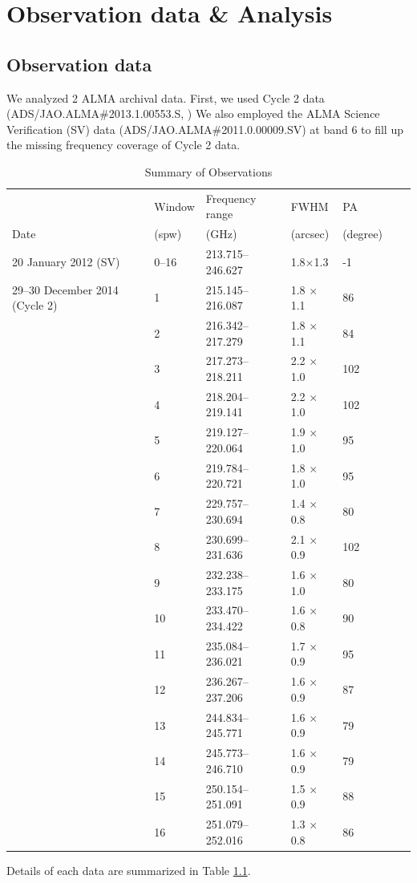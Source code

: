 \chapter{Observation data \& Analysis
\label{chap:Orion-KL}}
\section{Observation data}
We analyzed 2 ALMA archival data. First, we used Cycle 2 data (ADS/JAO.ALMA\#2013.1.00553.S, 
\cite{Pagani+2017}) 
We also employed the ALMA Science Verification (SV) data (ADS/JAO.ALMA\#2011.0.00009.SV) 
at band 6 to fill up the missing frequency coverage of Cycle 2 data. 
\renewcommand{\arraystretch}{1.5}
\begin{table}[htb]
\begin{center}
  \caption{Summary of Observations}
  \label{tab:Obs_Ori}
{\scriptsize
  \begin{tabular}{lllllll} \hline \hline
 & Window & Frequency range & FWHM & PA \\
Date & (spw)  & (GHz) & (arcsec) & (degree) \\ \hline 
20 January 2012 (SV) & 0--16 & 213.715--246.627& 1.8$\times$1.3 & -1  \\  \hline
29--30 December 2014 (Cycle 2)&1 & 215.145--216.087 & 1.8 $\times$1.1 & 86 \\
&2 & 216.342--217.279 & 1.8 $\times$1.1 & 84 \\
&3 & 217.273--218.211 & 2.2 $\times$1.0 & 102 \\
&4 & 218.204--219.141 & 2.2 $\times$1.0 & 102 \\
&5 & 219.127--220.064 & 1.9 $\times$1.0 & 95 \\
&6 & 219.784--220.721 & 1.8 $\times$1.0  & 95 \\
&7 & 229.757--230.694 & 1.4 $\times$0.8 & 80 \\
&8 & 230.699--231.636 & 2.1 $\times$0.9 & 102 \\
&9 & 232.238--233.175 & 1.6 $\times$1.0 & 80 \\
&10 & 233.470--234.422 & 1.6 $\times$0.8 & 90 \\
&11 & 235.084--236.021 & 1.7 $\times$0.9 & 95 \\
&12 & 236.267--237.206 & 1.6 $\times$0.9 & 87 \\
&13 & 244.834--245.771 & 1.6 $\times$0.9 & 79 \\
&14 & 245.773--246.710 & 1.6 $\times$0.9 & 79 \\
&15 & 250.154--251.091 & 1.5 $\times$0.9 & 88 \\
&16 & 251.079--252.016 & 1.3 $\times$0.8 & 86 \\ \hline
  \end{tabular}
  }
\end{center}
\end{table}
Details of each data are summarized in Table \ref{tab:Obs_Ori}.

